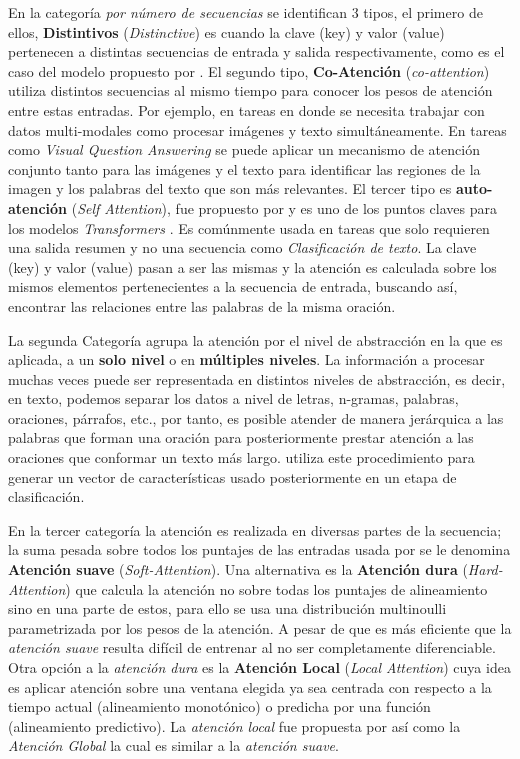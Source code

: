 En la categoría \textit{por número de secuencias} se identifican 3 tipos, el primero de ellos,
\textbf{Distintivos} (\textit{Distinctive}) es cuando la clave (key) y valor (value) pertenecen a
distintas secuencias de entrada y salida respectivamente, como es el caso del modelo propuesto por
\citeauthor*{bahdanau2016neural}. El segundo tipo, \textbf{Co-Atención} (\textit{co-attention}) utiliza
distintos secuencias al mismo tiempo para conocer los pesos de atención entre estas entradas. Por ejemplo,
en tareas en donde se necesita trabajar con datos multi-modales como procesar imágenes y texto
simultáneamente. En tareas como \textit{Visual Question Answering}
se puede aplicar un mecanismo de atención conjunto tanto para las imágenes y el texto para identificar
las regiones de la imagen y los palabras del texto que son más relevantes. El
tercer tipo es \textbf{auto-atención} (\textit{Self Attention}), fue propuesto por \citeauthor*{yang2016hierarchical} y es uno
de los puntos claves para los modelos \textit{Transformers} \cite{DBLP:journals/corr/VaswaniSPUJGKP17}.
Es comúnmente usada en tareas que solo requieren una salida resumen y no una secuencia como \textit{
Clasificación de texto}. La clave (key) y valor (value) pasan a ser las mismas y la atención es
calculada sobre los mismos elementos pertenecientes a la secuencia de entrada, buscando
así, encontrar las relaciones entre las palabras de la misma oración.

La segunda Categoría agrupa la atención por el nivel de abstracción en la que es aplicada, a un
\textbf{solo nivel} o en \textbf{múltiples niveles}. La información a procesar muchas veces puede ser
representada en distintos niveles de abstracción, es decir, en texto, podemos separar los datos a
nivel de letras, n-gramas, palabras, oraciones, párrafos, etc., por tanto, es posible atender
de manera jerárquica a las palabras que forman una oración para posteriormente prestar atención a
las oraciones que conformar un texto más largo. \citeauthor*{yang2016hierarchical} utiliza este procedimiento
para generar un vector de características usado posteriormente en un etapa de clasificación.

En la tercer categoría la atención es realizada en diversas partes de la secuencia; la suma pesada sobre
todos los puntajes de las entradas usada por \citeauthor*{bahdanau2016neural} se le denomina \textbf{
Atención suave} (\textit{Soft-Attention}). Una alternativa es la \textbf{Atención dura}
(\textit{Hard-Attention}) \cite{DBLP:journals/corr/XuBKCCSZB15} que calcula la atención no sobre todas
los puntajes de alineamiento sino en una parte de estos, para ello se usa una distribución multinoulli
parametrizada por los pesos de la atención. A pesar de que es más eficiente que la
\textit{atención suave} resulta difícil de entrenar al no ser completamente diferenciable. Otra opción
a la \textit{atención dura} es la \textbf{Atención Local} (\textit{Local Attention}) cuya idea es aplicar
atención sobre una ventana elegida ya sea centrada con respecto a la tiempo actual (alineamiento monotónico)
o predicha por una función (alineamiento predictivo). La \textit{atención local} fue propuesta por
\citeauthor*{DBLP:journals/corr/LuongPM15} así como la \textit{Atención Global} la cual es similar a la
\textit{atención suave}.

